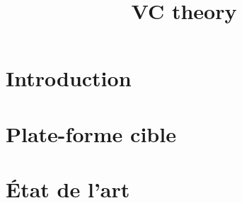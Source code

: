 \documentclass[a4paper]{report}
\title{VC theory}
\begin{document}
\tableofcontents

\renewcommand{\thesection}{\arabic{section}}

\newtheorem{theorem}{Theorem}
\newtheorem{lemma}{Lemme}

\renewcommand{\thetheorem}{\empty{}}
\renewcommand{\thelemma}{\empty{}} 

\newenvironment{proof}[1][Proof]{\begin{trivlist}
\item[\hskip \labelsep {\bfseries #1}]}{\end{trivlist}}
\newenvironment{definition}[1][Definition]{\begin{trivlist}
\item[\hskip \labelsep {\bfseries #1}]}{\end{trivlist}}
\newenvironment{example}[1][Example]{\begin{trivlist}
\item[\hskip \labelsep {\bfseries #1}]}{\end{trivlist}}
\newenvironment{remark}[1][Rq:]{\begin{trivlist}
\item[\hskip \labelsep {\bfseries #1}]}{\end{trivlist}}
\newenvironment{rappel}[1][rappel:]{\begin{trivlist}
\item[\hskip \labelsep {\bfseries #1}]}{\end{trivlist}}


\chapter*{Introduction}




\chapter*{Plate-forme cible}




\chapter*{État de l'art}
\end{document}
